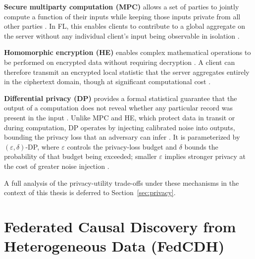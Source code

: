\textbf{Secure multiparty computation (MPC)} allows a set of parties to jointly compute a function of their inputs while keeping those inputs private from all other parties \cite{Cramer2015}. In FL, this enables clients to contribute to a global aggregate on the server without any individual client's input being observable in isolation \cite{Li2024FederatedCD}.

\textbf{Homomorphic encryption (HE)} enables complex mathematical operations to be performed on encrypted data without requiring decryption \cite{Doan2023ASO}. A client can therefore transmit an encrypted local statistic that the server aggregates entirely in the ciphertext domain, though at significant computational cost \cite{Li2024FederatedCD}.

\textbf{Differential privacy (DP)} provides a formal statistical guarantee that the output of a computation does not reveal whether any particular record was present in the input \cite{Dwork2014TheAF}. Unlike MPC and HE, which protect data in transit or during computation, DP operates by injecting calibrated noise into outputs, bounding the privacy loss that an adversary can infer \cite{Dwork2006CalibratingNT}. It is parameterized by $(\varepsilon, \delta)$-DP, where $\varepsilon$ controls the privacy-loss budget and $\delta$ bounds the probability of that budget being exceeded; smaller $\varepsilon$ implies stronger privacy at the cost of greater noise injection \cite{Dwork2014TheAF}.

A full analysis of the privacy-utility trade-offs under these mechanisms in the context of this thesis is deferred to Section~\ref{sec:privacy}.


\section{Federated Causal Discovery from Heterogeneous Data (FedCDH)}\label{sec:FedCDH}



